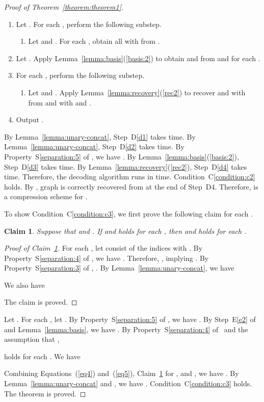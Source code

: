 \documentclass[12pt]{article}
\newtheorem{claim}{Claim}
\begin{document}
\begin{proof}[Proof of Theorem~\ref{theorem:theorem1}]
\begin{enumerate}[\em D1:]
\item 
\label{d2}
Let .  For each , perform the
following substep.
\begin{enumerate}[\em D2.1:]
\item 
Let  and .  For
each , obtain all  with
 from .
\end{enumerate}

\item 
\label{d3}
Let .  
Apply Lemma~\ref{lemma:basis}(\ref{basis:2}) to obtain  and
 from
 and
 for each .

\item 
\label{d4}
For each , perform the following substep.
\begin{enumerate}[\em D4.1:]
\item 
Let  and .
Apply Lemma~\ref{lemma:recovery}(\ref{rec2}) to recover  and
 with  from  and  with
 and .
\end{enumerate}

\item 
\label{d5}
Output .
\end{enumerate}
By Lemma~\ref{lemma:unary-concat}, Step~D\ref{d1} takes  time.
By Lemma~\ref{lemma:unary-concat}, Step~D\ref{d2} takes  time.
By
Property~S\ref{separation:5} of , we have .  
By Lemma~\ref{lemma:basis}(\ref{basis:2}), Step~D\ref{d3} takes 
time.
By Lemma~\ref{lemma:recovery}(\ref{rec2}), Step~D\ref{d4} takes 
time.  Therefore, the decoding algorithm  runs
in  time.  Condition~C\ref{condition:c2} holds.  By
, graph  is correctly
recovered from  at the end of Step~D4. Therefore,
 is a compression scheme for .

\bigskip
\noindent
To show Condition~C\ref{condition:c3}, we first prove the following
claim for each .
\begin{claim}
\label{claim:claim1}
Suppose that  and
.  If  and
 holds for each
, then  and
 holds for each
.
\end{claim}
\begin{proof}[Proof of Claim~\ref{claim:claim1}]
For each , let  consist of the indices  with
.  
By Property~S\ref{separation:4} of , we have . Therefore, , implying
. By
Property~S\ref{separation:3} of , .  By Lemma~\ref{lemma:unary-concat}, we have

We also have 

The claim is proved.
\end{proof}

Let . For each , let
.  By Property~S\ref{separation:5}
of , we have .  By Step~E\ref{e2}
of~ and Lemma~\ref{lemma:basis}, we have
.  By
Property~S\ref{separation:4} of~ and the assumption that
,

holds for each .  
We have

Combining Equations~(\ref{eq4}) and~(\ref{eq5}),
Claim~\ref{claim:claim1} for , and , we have .  By
Lemma~\ref{lemma:unary-concat} and
, we have .
Condition~C\ref{condition:c3} holds.  The theorem is proved.
\end{proof}
\end{document}
